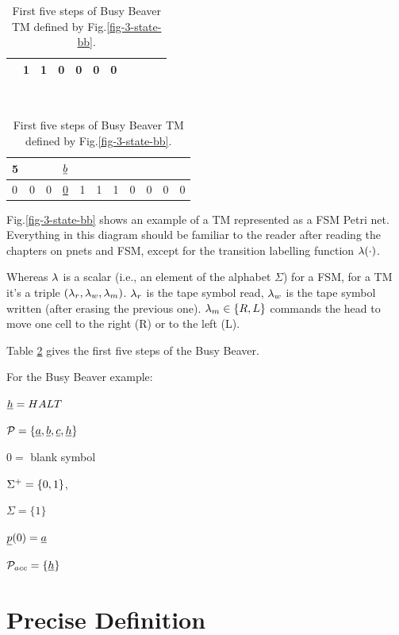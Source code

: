 \begin{table}[h!]
\begin{tabular}{lllllllllll}
& \multicolumn{1}{l|}{1} 
& \multicolumn{1}{l|}{\cellcolor[HTML]{FFFFC7}1} 
& \multicolumn{1}{l|}{0} 
& \multicolumn{1}{l|}{\cellcolor[HTML]{FFFFC7}0} 
& \multicolumn{1}{l|}{0} 
& \multicolumn{1}{l|}{\cellcolor[HTML]{FFFFC7}0} 
\\ \hline
\end{tabular}
\\
\begin{tabular}{lllllllllll}
5 &  &  & $\rvb$ & & &  &  &  &  &  
\\ \hline
\multicolumn{1}{|l|}{\cellcolor[HTML]{FFFFC7}0} 
& \multicolumn{1}{l|}{0} 
& \multicolumn{1}{l|}{\cellcolor[HTML]{FFFFC7}0} 
& \multicolumn{1}{l|}{\ul{0}} 
& \multicolumn{1}{l|}{\cellcolor[HTML]{FFFFC7}1} 
& \multicolumn{1}{l|}{1} 
& \multicolumn{1}{l|}{\cellcolor[HTML]{FFFFC7}1} 
& \multicolumn{1}{l|}{0} 
& \multicolumn{1}{l|}{\cellcolor[HTML]{FFFFC7}0} 
& \multicolumn{1}{l|}{0} 
& \multicolumn{1}{l|}{\cellcolor[HTML]{FFFFC7}0} 
\\ \hline
\end{tabular}
\caption{First five steps of Busy Beaver TM 
defined by Fig.\ref{fig-3-state-bb}. }
\label{tab-busy-beaver}
\end{table}

Fig.\ref{fig-3-state-bb} shows an example of
a TM represented as a FSM Petri net. Everything in this diagram
should be familiar to the reader after reading the chapters
on pnets and FSM, except for the
transition  labelling function $\lambda(\cdot)$.

Whereas $\lambda$ is a scalar (i.e., an element of the alphabet $\Sigma$)
for a FSM, for a TM it's a triple $(\lambda_r, \lambda_w, \lambda_m)$.
$\lambda_r$ is the tape symbol read, $\lambda_w$
is the tape symbol written (after erasing the 
previous one). $\lambda_m\in\{R, L\}$
commands the head to move one cell to the right (R)
or to the left (L).

Table \ref{tab-busy-beaver} gives the first five 
steps of the  Busy Beaver.

For the Busy Beaver example:

$\rvh=HALT$

$\calp= \{\rva, \rvb, \rvc, \rvh\}$  

$0=$ blank symbol

$\Sigma^+ =\{0,1\}$, 

$\Sigma = \{1\}$

$\rvp(0)=\rva$

$\calp_{acc} =\{\rvh \}$




\section{Precise Definition}

